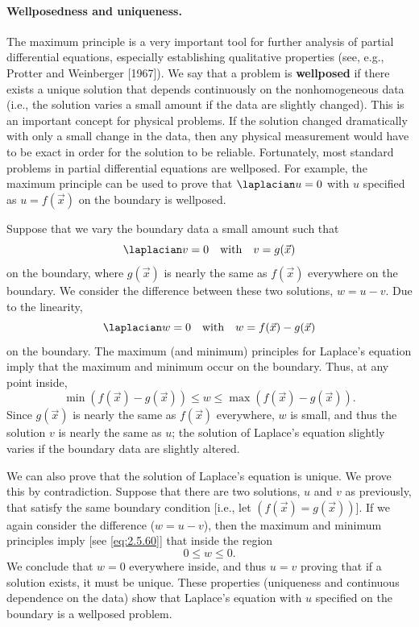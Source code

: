 \paragraph{Wellposedness and uniqueness.}
The maximum principle is a very important tool for further analysis of partial differential equations, especially establishing qualitative properties (see, e.g., Protter and Weinberger [1967]). We say that a problem is \textbf{wellposed} if there exists a unique solution that depends continuously on the nonhomogeneous data (i.e., the solution varies a small amount if the data are slightly changed). This is an important concept for physical problems. If the solution changed dramatically with only a small change in the data, then any physical measurement would have to be exact in order for the solution to be reliable. Fortunately, most standard problems in partial differential equations are wellposed. For example, the maximum principle can be used to prove that $\laplacian u = 0$ with $u$ specified as $u = f(\vec{x})$ on the boundary is wellposed.

Suppose that we vary the boundary data a small amount such that
\[
\laplacian v = 0 \quad\text{with}\quad v = g(\vec{x})
\]
on the boundary, where $g(\vec{x})$ is nearly the same as $f(\vec{x})$ everywhere on the boundary. We consider the difference between these two solutions, $w = u - v$. Due to the linearity,
\[
\laplacian w = 0 \quad\text{with}\quad w = f(\vec{x}) - g(\vec{x})
\]
on the boundary. The maximum (and minimum) principles for Laplace's equation imply that the maximum and minimum occur on the boundary. Thus, at any point inside,
\begin{equation}
\label{eq:2.5.60}
\min(f(\vec{x}) - g(\vec{x})) \le w \le \max(f(\vec{x}) - g(\vec{x})).
\end{equation}
Since $g(\vec{x})$ is nearly the same as $f(\vec{x})$ everywhere, $w$ is small, and thus the solution $v$ is nearly the same as $u$; the solution of Laplace's equation slightly varies if the boundary data are slightly altered.

We can also prove that the solution of Laplace's equation is unique. We prove this by contradiction. Suppose that there are two solutions, $u$ and $v$ as previously, that satisfy the same boundary condition [i.e., let $(f(\vec{x}) = g(\vec{x}))$]. If we again consider the difference ($w = u - v$), then the maximum and minimum principles imply [see \eqref{eq:2.5.60}] that inside the region
\[
0 \le w \le 0.
\]
We conclude that $w = 0$ everywhere inside, and thus $u = v$ proving that if a solution exists, it must be unique. These properties (uniqueness and continuous dependence on the data) show that Laplace's equation with $u$ specified on the boundary is a wellposed problem.


